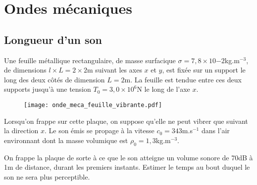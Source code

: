 \chapter{Ondes mécaniques}

\newpage

\section{Longueur d'un son}

Une feuille métallique rectangulaire, de masse surfacique $\sigma=7,8\times10{-2}$kg.m$^{-3}$, de dimensions $l\times L=2\times2$m suivant les axes $x$ et $y$, est fixée sur un support le long des deux côtés de dimension $L=2$m. La feuille est tendue entre ces deux supports jusqu'à une tension $T_0=3,0\times10^6$N le long de l'axe $x$.

\begin{figure}[h]
\centering
  \texttt{[image: onde\_meca\_feuille\_vibrante.pdf]}
\end{figure}

Lorsqu'on frappe sur cette plaque, on suppose qu'elle ne peut vibrer que suivant la direction $x$. Le son émis se propage à la vitesse $c_0=343$m.s$^{-1}$ dans l'air environnant dont la masse volumique est $\rho_0=1,3$kg.m$^{-3}$.

On frappe la plaque de sorte à ce que le son atteigne un volume sonore de 70dB à 1m de distance, durant les premiers instants. Estimer le temps au bout duquel le son ne sera plus perceptible.

\newpage


